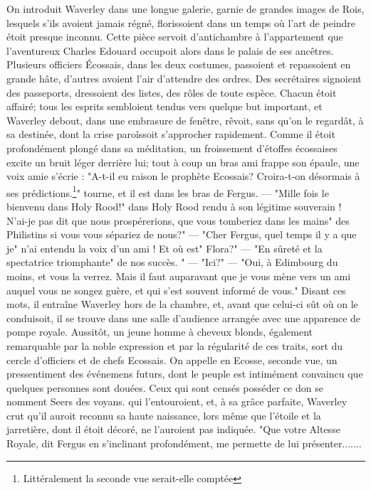 On introduit Waverley dans une longue galerie, garnie de grandes images de Rois, lesquels s'ils avoient jamais régné, florissoient dans un temps où l'art de peindre étoit presque inconnu. Cette pièce servoit d'antichambre à l'appartement que l'aventureux Charles Edouard occupoit alors dans le palais de ses ancêtres. Plusieurs officiers Écossais, dans les deux costumes, passoient et repassoient en grande hâte, d'autres avoient l'air d'attendre des ordres. Des secrétaires signoient des passeports, dressoient des listes, des rôles de toute espèce. Chacun étoit affairé; tous les esprits sembloient tendus vers quelque but important, et Waverley debout, dans une embrasure de fenêtre, rêvoit, sans qu'on le regardât, à sa destinée, dont la crise paroîssoit s'approcher rapidement.
Comme il étoit profondément plongé dans sa méditation, un froissement d'étoffes écossaises excite un bruit léger derrière lui; tout à coup un bras ami frappe son épaule, une voix amie s'écrie : "A-t-il eu raison le prophète Ecossais? Croira-t-on désormais à ses prédictions.\footnote{Littéralement la seconde vue serait-elle comptée}"\setcounter{page}{226} tourne, et il est dans les bras de Fergus.
— "Mille fois le bienvenu dans Holy Rood!" dans Holy Rood rendu à son légitime souverain ! N'ai-je pas dit que nous prospérerions, que vous tomberiez dans les mains" des Philistins si vous vous sépariez de nous?"
— "Cher Fergus, quel temps il y a que je" n'ai entendu la voix d'un ami ! Et où est" Flora?"
— "En sûreté et la spectatrice triomphante" de nos succès. "
— "Ici?"
— "Oui, à Edimbourg du moins, et vous la verrez. Mais il faut auparavant que je vous mène vers un ami auquel vous ne songez guère, et qui s'est souvent informé de vous."
Disant ces mots, il entraîne Waverley hors de la chambre, et, avant que celui-ci sût où on le conduisoit, il se trouve dans une salle d'audience arrangée avec une apparence de pompe royale.
Aussitôt, un jeune homme à cheveux blonds, également remarquable par la noble expression et par la régularité de ces traits, sort du cercle d'officiers et de chefs Ecossais.
On appelle en Ecosse, seconde vue, un pressentiment des événemens futurs, dont le peuple est intimément convaincu que quelques personnes sont douées. Ceux qui sont censés posséder ce don se nomment Seers des voyans.\setcounter{page}{227} qui l'entouroient, et, à sa grâce parfaite, Waverley crut qu'il auroit reconnu sa haute naissance, lors même que l'étoile et la jarretière, dont il étoit décoré, ne l'auroient pas indiquée.
"Que votre Altesse Royale, dit Fergus en s'inclinant profondément, me permette de lui présenter.......

